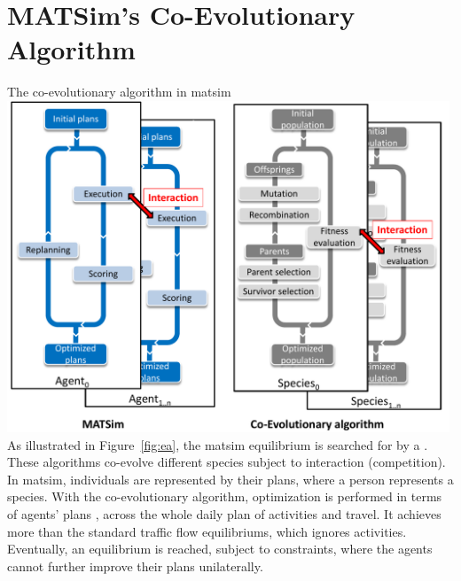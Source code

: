\section{MATSim's Co-Evolutionary Algorithm}
\label{sec:co-ev}
%
%
{The co-evolutionary algorithm in \protect\gls{matsim}%
%
}%
{\label{fig:ea}}%
{\includegraphics[width=0.99\textwidth, angle=0]{using/figures/MATSimVSea.pdf}}%
{}
%
%
As illustrated in Figure~\ref{fig:ea}, the \gls{matsim} equilibrium is searched for by a \emph{} \citep[see, e.g.,][]{PopoviciEtAl_2012}. These \glspl{algorithm} co-evolve different species subject to interaction (\eg competition). In \gls{matsim}, individuals are represented by their plans, where a person represents a species. With the co-evolutionary algorithm, optimization is performed in terms of agents' plans , \ie across the whole daily plan of activities and travel. It achieves more than the standard traffic flow \glspl{equilibrium}, which ignores activities. Eventually, an equilibrium is reached, subject to constraints, where the agents cannot further improve their plans unilaterally. 

